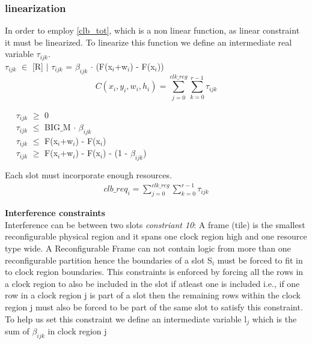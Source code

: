 \documentclass[conference]{IEEEtran}
\begin{document}
\subsubsection{linearization}
In order to employ \ref{clb_tot}, which is a non linear function, as linear constraint it must be linearized. To linearize this function we define an intermediate real variable $\tau_{ijk}$. \\

$\tau_{ijk}$ $\in$ [R] $\mid$ $\tau_{ijk}$ = $\beta_{ijk}$ $\cdot$ (F(x$_i$+w$_i$) - F(x$_i$))
\begin{equation}
C(x_i,y_i,w_i,h_i) = \sum_{j=0}^{clk\_reg} \sum_{k=0}^{r-1} \tau_{ijk}
\end{equation}

$\quad$ $\tau_{ijk}$ $\geq$ 0 \\

$\quad$ $\tau_{ijk}$ $\leq$ BIG$\_$M $\cdot$ $\beta_{ijk}$ \\ 

$\quad$ $\tau_{ijk}$ $\leq$ F(x$_i$+w$_i$) - F(x$_i$) \\

$\quad$ $\tau_{ijk}$ $\geq$ F(x$_i$+w$_i$) - F(x$_i$) - (1 - $\beta_{ijk}$) \\


\begin{constraint} Each slot must incorporate enough resources. \\
\begin{equation}
\begin{split}
clb\_req_i = \sum_{j=0}^{clk\_reg} \sum_{k=0}^{r-1} \tau_{ijk}
\end{split}
\end{equation}
\end{constraint}


\textbf{Interference constraints} \\
Interference can be between two slots 
\textit{constriant 10}: A frame (tile) is the smallest reconfigurable physical region and it spans one clock region high and one resource type wide. A Reconfigurable Frame can not contain logic from more than one reconfigurable partition hence the boundaries of a slot S$_i$ must be forced to fit in to clock region boundaries. 
This constraints is enforced by forcing all the rows in a clock region to also be included in the slot if atleast one is included i.e., if one row in a clock region j is part of a slot then the remaining rows within the clock region j must also be forced to be part of the same slot to satisfy this constraint. \\
To help us set this constraint we define an intermediate variable l$_{j}$ which is the sum of $\beta_{ijk}$ in clock region j
\end{document}
